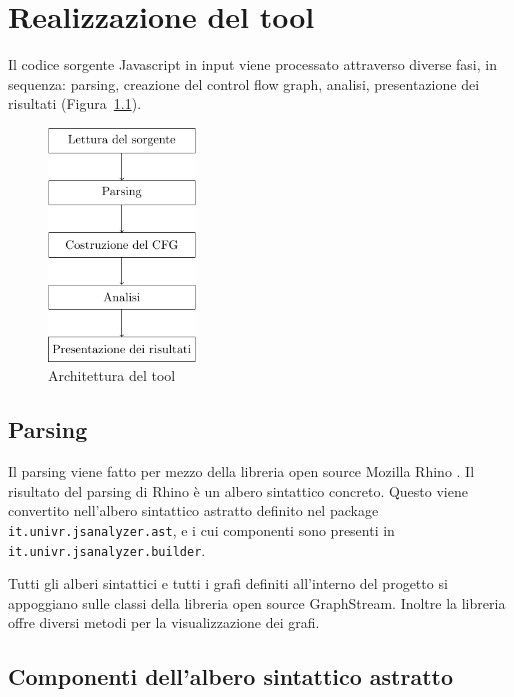 \chapter{Realizzazione del tool}

Il codice sorgente Javascript in input viene processato attraverso diverse fasi, in sequenza: parsing, creazione del control flow graph, analisi, presentazione dei risultati (Figura~\ref{fig:realizzazione:diagramma}).

\begin{figure}[htbp]
    \centering
    \includegraphics[width=0.35\textwidth]{capitoli/realizzazione/immagini/diagrammablocchi.pdf}
    \caption{Architettura del tool}
    \label{fig:realizzazione:diagramma}
\end{figure}

\section{Parsing}

Il parsing viene fatto per mezzo della libreria open source Mozilla Rhino \cite{rhino}. Il risultato del parsing di Rhino è un albero sintattico concreto. Questo viene convertito nell'albero sintattico astratto definito nel package \texttt{it.univr.jsanalyzer.ast}, e i cui componenti sono presenti in \texttt{it.univr.jsanalyzer.builder}.

Tutti gli alberi sintattici e tutti i grafi definiti all'interno del progetto si appoggiano sulle classi della libreria open source GraphStream. Inoltre la libreria offre diversi metodi per la visualizzazione dei grafi. 

\section{Componenti dell'albero sintattico astratto}

